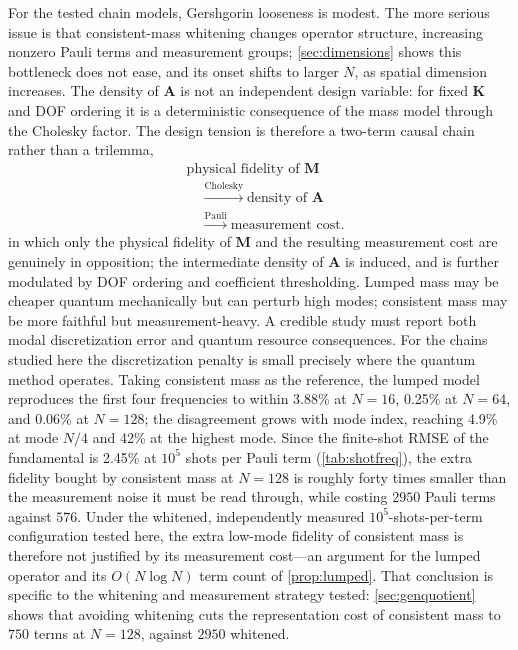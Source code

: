 \documentclass{ieeeaccess}
\newcommand{\M}{\mathbf{M}}
\newcommand{\K}{\mathbf{K}}
\newcommand{\A}{\mathbf{A}}
\begin{document}
For the tested chain models, Gershgorin looseness is modest. The more serious issue is that consistent-mass whitening changes operator structure, increasing nonzero Pauli terms and measurement groups; \cref{sec:dimensions} shows this bottleneck does not ease, and its onset shifts to larger $N$, as spatial dimension increases. The density of $\A$ is not an independent design variable: for fixed $\K$ and DOF ordering it is a deterministic consequence of the mass model through the Cholesky factor. The design tension is therefore a two-term causal chain rather than a trilemma,
\begin{equation}
\boxed{
\begin{aligned}
&\text{physical fidelity of }\M\\
&\quad\xrightarrow{\text{Cholesky}}\text{density of }\A\\
&\quad\xrightarrow{\text{Pauli}}\text{measurement cost}.
\end{aligned}}
\label{eq:trilemma}
\end{equation}
in which only the physical fidelity of $\M$ and the resulting measurement cost are genuinely in opposition; the intermediate density of $\A$ is induced, and is further modulated by DOF ordering and coefficient thresholding. Lumped mass may be cheaper quantum mechanically but can perturb high modes; consistent mass may be more faithful but measurement-heavy. A credible study must report both modal discretization error and quantum resource consequences. For the chains studied here the discretization penalty is small precisely where the quantum method operates. Taking consistent mass as the reference, the lumped model reproduces the first four frequencies to within 3.88\% at $N=16$, 0.25\% at $N=64$, and 0.06\% at $N=128$; the disagreement grows with mode index, reaching 4.9\% at mode $N/4$ and 42\% at the highest mode. Since the finite-shot RMSE of the fundamental is 2.45\% at $10^5$ shots per Pauli term (\cref{tab:shotfreq}), the extra fidelity bought by consistent mass at $N=128$ is roughly forty times smaller than the measurement noise it must be read through, while costing $2950$ Pauli terms against $576$. Under the whitened, independently measured $10^5$-shots-per-term configuration tested here, the extra low-mode fidelity of consistent mass is therefore not justified by its measurement cost---an argument for the lumped operator and its $O(N\log N)$ term count of \cref{prop:lumped}. That conclusion is specific to the whitening and measurement strategy tested: \cref{sec:genquotient} shows that avoiding whitening cuts the representation cost of consistent mass to $750$ terms at $N=128$, against $2950$ whitened.
\end{document}
